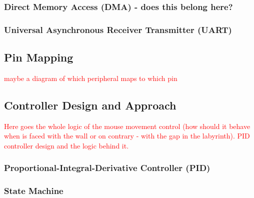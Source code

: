 \subsubsection*{Direct Memory Access (DMA) - does this belong here?}

\subsubsection*{Universal Asynchronous Receiver Transmitter (UART)}


\subsection{Pin Mapping}
\textcolor{red}{
maybe a diagram of which peripheral maps to which pin
}


\subsection{Controller Design and Approach}

\textcolor{red}{
Here goes the whole logic of the mouse movement control (how should it behave when is faced with the wall or on contrary - with the gap in the labyrinth). PID controller design and the logic behind it.
}

\subsubsection{Proportional-Integral-Derivative Controller (PID)}

\subsubsection{State Machine}



